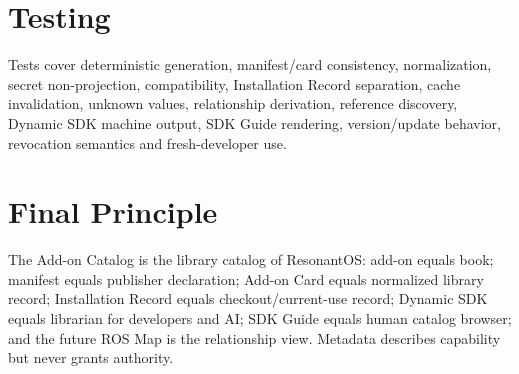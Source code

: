 \documentclass{article}
\begin{document}
\section{Testing}
Tests cover deterministic generation, manifest/card consistency, normalization, secret non-projection, compatibility, Installation Record separation, cache invalidation, unknown values, relationship derivation, reference discovery, Dynamic SDK machine output, SDK Guide rendering, version/update behavior, revocation semantics and fresh-developer use.

\section{Final Principle}
The Add-on Catalog is the library catalog of ResonantOS: add-on equals book; manifest equals publisher declaration; Add-on Card equals normalized library record; Installation Record equals checkout/current-use record; Dynamic SDK equals librarian for developers and AI; SDK Guide equals human catalog browser; and the future ROS Map is the relationship view. Metadata describes capability but never grants authority.
\end{document}
